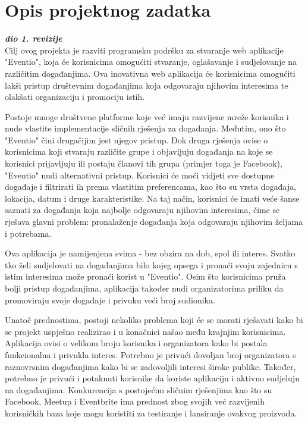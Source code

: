 \chapter{Opis projektnog zadatka}
		
		\textbf{\textit{dio 1. revizije}}\\
		
		Cilj ovog projekta je razviti programsku podršku za stvaranje web aplikacije "Eventio", koja će korisnicima omogućiti stvaranje, oglašavanje i sudjelovanje na različitim događanjima. Ova inovativna web aplikacija će korisnicima omogućiti lakši pristup društevnim događanjima koja odgovaraju njihovim interesima te olakšati organizaciju i promociju istih.
		
		Postoje mnoge društvene platforme koje već imaju razvijene mreže korisnika i nude vlastite implementacije sličnih rješenja za događanja. Međutim, ono što "Eventio" čini drugačijim jest njegov pristup. Dok druga rješenja ovise o korisnicima koji stvaraju različite grupe i objavljuju događanja na koje se korisnici prijavljuju ili postaju članovi tih grupa (primjer toga je Facebook), "Eventio" nudi alternativni pristup. Korisnici će moći vidjeti sve dostupne događaje i filtrirati ih prema vlastitim preferencama, kao što su vrsta događaja, lokacija, datum i druge karakteristike. Na taj način, korisnici će imati veće šanse saznati za događanja koja najbolje odgovaraju njihovim interesima, čime se rješava glavni problem: pronalaženje događanja koja odgovaraju njihovim željama i potrebama.
		
		Ova aplikacija je namijenjena svima - bez obzira na dob, spol ili interes. Svatko tko želi sudjelovati na događanjima bilo kojeg opsega i pronaći svoju zajednicu s istim interesima može pronaći korist u "Eventio". Osim što korisnicima pruža bolji pristup događanjima, aplikacija također nudi organizatorima priliku da promoviraju svoje događaje i privuku veći broj sudionika.
		
		Unatoč prednostima, postoji nekoliko problema koji će se morati rješavati kako bi se projekt uspješno realizirao i u konačnici našao među krajnjim korisnicima. Aplikacija ovisi o velikom broju korisnika i organizatora kako bi postala funkcionalna i privukla interes. Potrebno je privući dovoljan broj organizatora s raznovrsnim događanjima kako bi se zadovoljili interesi široke publike. Također, potrebno je privući i potaknuti korisnike da koriste aplikaciju i aktivno sudjeluju na događanjima. Konkurencija s postojećim sličnim rješenjima kao što su Facebook, Meetup i Eventbrite ima prednost zbog svojih već razvijenih korisničkih baza koje mogu koristiti za testiranje i lansiranje ovakvog proizvoda.
		
